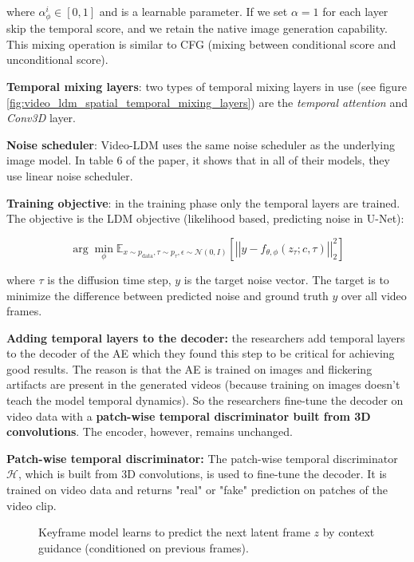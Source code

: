 where $\alpha_\phi^i \in [0, 1]$ and is a learnable parameter. If we set $\alpha = 1$ for each layer skip the temporal score, and we retain the native image generation capability. This mixing operation is similar to CFG (mixing between conditional score and unconditional score).

\textbf{Temporal mixing layers}: two types of temporal mixing layers in use (see figure \ref{fig:video_ldm_spatial_temporal_mixing_layers}) are the \textit{temporal attention} and \textit{Conv3D} layer.

\textbf{Noise scheduler}: Video-LDM uses the same noise scheduler as the underlying image model. In table 6 of the paper, it shows that in all of their models, they use linear noise scheduler.

\textbf{Training objective}: in the training phase only the temporal layers are trained. The objective is the LDM objective (likelihood based, predicting noise in U-Net):

\[ \arg \min_\phi \mathbb{E}_{x \sim p_{\text{data}}, \tau \sim p_{\tau}, \epsilon \sim \mathcal{N} (0, I)} \left[ \left| \left| y - f_{\theta,\phi} (z_{\tau} ; c, \tau) \right| \right|^2_2 \right] \]

where $\tau$ is the diffusion time step, $y$ is the target noise vector. The target is to minimize the difference between predicted noise and ground truth $y$ over all video frames.

\textbf{Adding temporal layers to the decoder:} the researchers add temporal layers to the decoder of the AE which they found this step to be critical for achieving good results. The reason is that the AE is trained on images and flickering artifacts are present in the generated videos (because training on images doesn't teach the model temporal dynamics). So the researchers fine-tune the decoder on video data with a \textbf{patch-wise temporal discriminator built from 3D convolutions}. The encoder, however, remains unchanged.

\textbf{Patch-wise temporal discriminator:} The patch-wise temporal discriminator $\mathcal{H}$, which is built from 3D convolutions, is used to fine-tune the decoder. It is trained on video data and returns "real" or "fake" prediction on patches of the video clip.


\begin{figure}
    \centering
    \scalebox{0.4}{
        
    }
    \caption{Keyframe model learns to predict the next latent frame $z$ by context guidance (conditioned on previous frames).}
\end{figure}

